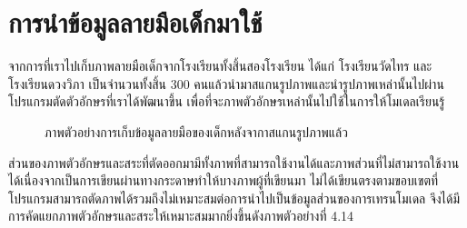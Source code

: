 \documentclass[12pt,oneside,openright,a4paper]{cpe-thai-project}
\begin{document}
\section{การนำข้อมูลลายมือเด็กมาใช้}
จากการที่เราไปเก็บภาพลายมือเด็กจากโรงเรียนทั้งสิ้นสองโรงเรียน ได้แก่ โรงเรียนวัดไทร และ โรงเรียนดวงวิภา เป็นจำนวนทั้งสิ้น 300 คนแล้วนำมาสแกนรูปภาพและนำรูปภาพเหล่านั้นไปผ่านโปรแกรมตัดตัวอักษรที่เราได้พัฒนาขึ้น
เพื่อที่จะภาพตัวอักษรเหล่านั้นไปใช้ในการให้โมเดลเรียนรู้   
\begin{figure}[!ht]\centering
  \setlength{\fboxrule}{0.2mm} %
  \setlength{\fboxsep}{1cm}
  \caption{ภาพตัวอย่างการเก็บข้อมูลลายมือของเด็กหลังจากาสแกนรูปภาพแล้ว}\label{fig:childrenTest}
\end{figure}
\newpage
ส่วนของภาพตัวอักษรและสระที่ตัดออกมามีทั้งภาพที่สามารถใช้งานได้และภาพส่วนที่ไม่สามารถใช้งานได้เนื่องจากเป็นการเขียนผ่านทางกระดาษทำให้บางภาพผู้ที่เขียนมา
ไม่ได้เขียนตรงตามขอบเขตที่โปรแกรมสามารถตัดภาพได้รวมถึงไม่เหมาะสมต่อการนำไปเป็นข้อมูลส่วนของการเทรนโมเดล จึงได้มีการคัดแยกภาพตัวอักษรและสระให้เหมาะสมมากยิ่งขึ้นดังภาพตัวอย่างที่ 4.14
\end{document}
